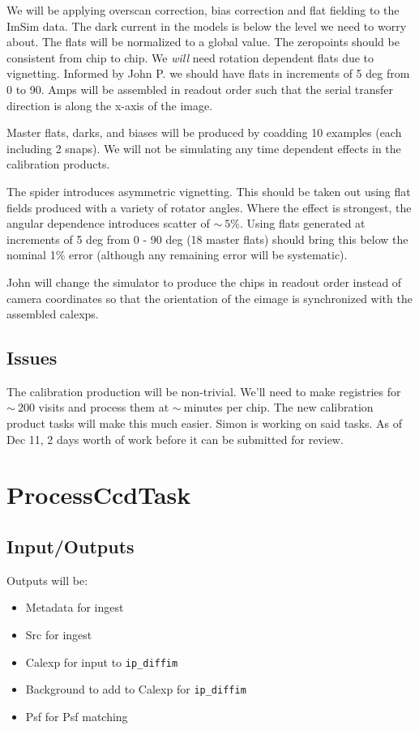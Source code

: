\documentclass[12pt]{article}
\begin{document}
We will be applying overscan correction, bias correction and flat
fielding to the ImSim data.  The dark current in the models is below
the level we need to worry about.  The flats will be normalized to a
global value.  The zeropoints should be consistent from chip to chip.
We {\it will} need rotation dependent flats due to vignetting.
Informed by John P. we should have flats in increments of 5 deg from 0
to 90.  Amps will be assembled in readout order such that the serial
transfer direction is along the x-axis of the image.

Master flats, darks, and biases will be produced by coadding 10
examples (each including 2 snaps).  We will not be simulating any time
dependent effects in the calibration products.

The spider introduces asymmetric vignetting.  This should be taken out
using flat fields produced with a variety of rotator angles.  Where
the effect is strongest, the angular dependence introduces scatter of
$\sim~5$\%.  Using flats generated at increments of 5 deg from 0 - 90
deg (18 master flats) should bring this below the nominal 1\% error
(although any remaining error will be systematic).

John will change the simulator to produce the chips in readout order
instead of camera coordinates so that the orientation of the eimage is
synchronized with the assembled calexps.

\subsection{Issues}

The calibration production will be non-trivial.  We'll need to make
registries for $\sim~200$ visits and process them at $\sim~$minutes
per chip.  The new calibration product tasks will make this much
easier.  Simon is working on said tasks.  As of Dec 11, 2 days worth
of work before it can be submitted for review.


\clearpage 
\section{ProcessCcdTask} 

\subsection{Input/Outputs}

Outputs will be:
\begin{itemize}
\item Metadata for ingest
\item Src for ingest
\item Calexp for input to {\tt ip\_diffim}
\item Background to add to Calexp for {\tt ip\_diffim}
\item Psf for Psf matching
\end{itemize}
\end{document}
